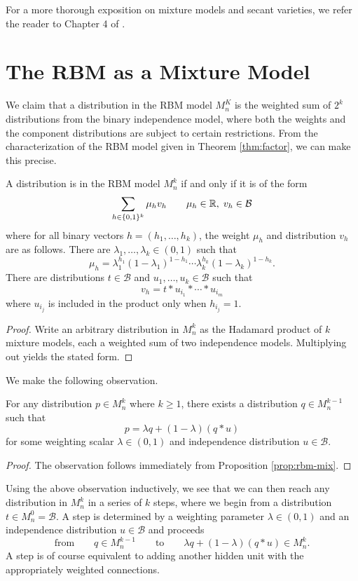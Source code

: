 \documentclass[cclicense]{hmcthesis}
\newcommand*{\Bin}{\mathcal{B}}
\numberwithin{equation}{section}
\begin{document}
    For a more thorough exposition on mixture models and secant varieties, we
    refer the reader to Chapter 4 of \citep{DSS08}.

\section{The RBM as a Mixture Model}

    We claim that a distribution in the RBM model $M_n^K$ is the weighted sum of
    $2^k$ distributions from the binary independence model, where both the
    weights and the component distributions are subject to certain restrictions.
    From the characterization of the RBM model given in Theorem
    \ref{thm:factor}, we can make this precise.
    \begin{proposition}\label{prop:rbm-mix}
    A distribution is in the RBM model $M_n^k$ if and only if it is of the form
    \[
        \sum_{h \in \{0,1\}^k} \mu_h v_h
        \qquad
        \mu_h \in \R, \;
        v_h \in \Bin
    \]
    where for all binary vectors $h = (h_1, \ldots, h_k)$, the weight $\mu_h$
    and distribution $v_h$ are as follows.  There are $\lambda_1, \ldots,
    \lambda_k \in (0,1)$ such that
    \[
        \mu_h = \lambda_1^{h_1}(1 - \lambda_1)^{1-h_1} \cdots
        \lambda_k^{h_k}(1-\lambda_k)^{1-h_k}.
    \]
    There are distributions $t \in \Bin$ and $u_1, \ldots, u_k \in \Bin$ such
    that
    \[
        v_h = t * u_{i_1} * \cdots * u_{i_m}
    \]
    where $u_{i_j}$ is included in the product only when $h_{i_j} = 1$.
    \end{proposition}
    \begin{proof}
        Write an arbitrary distribution in $M_n^k$ as the Hadamard product of
        $k$ mixture models, each a weighted sum of two independence models.
        Multiplying out yields the stated form.
    \end{proof}

    We make the following observation.
    \begin{proposition}
        For any distribution $p \in M_n^k$ where $k \ge 1$, there exists a
        distribution $q \in M_n^{k-1}$ such that
        \[
            p = \lambda q + (1 - \lambda)(q * u)
        \]
        for some weighting scalar $\lambda \in (0,1)$ and independence
        distribution $u \in \Bin$.
    \end{proposition}
    \begin{proof}
        The observation follows immediately from Proposition \ref{prop:rbm-mix}.
    \end{proof}
    Using the above observation inductively, we see that we can then reach any
    distribution in $M_n^k$ in a series of $k$ steps, where we begin from a
    distribution $t \in M_n^0 = \Bin$.  A step is determined by a weighting
    parameter $\lambda \in (0,1)$ and an independence distribution $u \in \Bin$
    and proceeds
    \[
        \text{from}\qquad q \in M_n^{k-1}
        \qquad\text{to}\qquad
        \lambda q + (1 - \lambda)(q * u) \in M_n^k.
    \]
    A step is of course equivalent to adding another hidden unit with the
    appropriately weighted connections.
\end{document}
